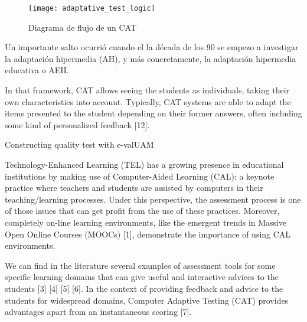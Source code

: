 \begin{figure}[htp!]
	\centering
	\texttt{[image: adaptative\_test\_logic]}
	\caption{Diagrama de flujo de un \acrshort{CAT}}
	\label{fig:diagrama_flujo_CAT}
\end{figure}

Un importante salto ocurrió cuando el la década de los 90 se empezo a investigar la adaptación hipermedia (\acrshort{AH}), y más concretamente, la adaptación hipermedia educativa o \acrshort{AEH}.





In that framework, CAT allows seeing the
students as individuals, taking their own characteristics into
account. Typically, CAT systems are able to adapt the items
presented to the student depending on their former answers, often
including some kind of personalized feedback [12].



Constructing quality test with e-valUAM

Technology-Enhanced Learning (TEL) has a growing presence in educational institutions by making use of Computer-Aided Learning (CAL): a keynote practice where teachers and students are assisted by computers in their teaching/learning processes. Under this perspective, the assessment process is one of those issues that can get profit from the use of these practices. Moreover, completely on-line learning environments, like the emergent trends in Massive Open Online Courses (MOOCs) [1], demonstrate the importance of using CAL environments.

We can find in the literature several examples of assessment tools for some specific learning domains that can give useful and interactive advices to the students [3] [4] [5] [6]. In the context of providing feedback and advice to the students for widespread domains, Computer Adaptive Testing (CAT) provides advantages apart from an instantaneous scoring [7]. 

